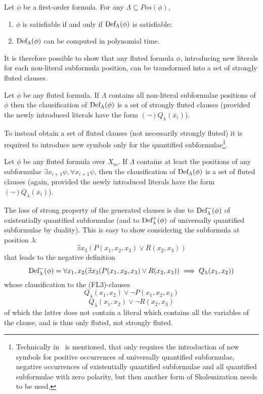 \begin{theorem}\label{thm:definitional-sat-preservation}
  Let \(\phi\) be a first-order formula. For any \(\Lambda \subseteq Pos(\phi)\),
  \begin{enumerate}
    \item \(\phi\) is satisfiable if and only if \(\fldef{\Lambda}{\phi}\) is satisfiable;
    \item \(\fldef{\Lambda}{\phi}\) can be computed in polynomial time.
  \end{enumerate}
\end{theorem} 

It is therefore possible to show that any fluted formula \(\phi\), introducing new literals for each non-literal subformula position, can be transformed into a set of strongly fluted clauses.

\begin{lemma}
  Let \(\phi\) be any fluted formula. If \(\Lambda\) contains all non-literal subformulae positions of \(\phi\) then the clausification of \(\fldef{\Lambda}{\phi}\) is a set of strongly fluted clauses (provided the newly introduced literals have the form \((\neg)Q_\lambda(\overline{x}_i)\)).
\end{lemma}

To instead obtain a set of fluted clauses (not necessarily strongly fluted) it is required to introduce new symbols only for the quantified subformulae\footnote{Technically in~\cite{hustadt2000resolution} is mentioned, that only requires the introduction of new symbols for positive occurrences of universally quantified subformulae, negative occurrences of existentially quantified subformulae and all quantified subformulae with zero polarity, but then another form of Skolemization needs to be used. }.

\begin{lemma}\label{lem:fluted-def-constraints}
  Let \(\phi\) be any fluted formula over \(X_m\). If \(\Lambda\) contains at least the positions of any subformulae \(\exists x_{i+1}\psi, \forall x_{i+1}\psi\), then the clausification of \(\fldef{\Lambda}{\phi}\) is a set of fluted clauses (again, provided the newly introduced literals have the form \((\neg)Q_\lambda(\overline{x}_i)\)).
\end{lemma}

The loss of strong property of the generated clauses is due to \(\fldef{\lambda}[-]{\phi}\) of existentially quantified subformulae (and to \(\fldef{\lambda}[+]{\phi}\) of universally quantified subformulae by duality).
This is easy to show considering the subformula at position \(\lambda\):
  \[
    \exists x_3 (P(x_1,x_2,x_3) \lor R(x_2,x_3))
  \]
that leads to the negative definition
  \[
    \fldef{\lambda}[-]{\phi} = \forall x_1,x_2(\exists x_3 (P(x_1,x_2,x_3) \lor R(x_2,x_3)) \implies Q_\lambda(x_1,x_2))
  \]
whose clausification to the (FL3)-clauses
  \[
    Q_\lambda(x_1,x_2) \lor \neg P(x_1,x_2,x_3)
  \]
  \[
    Q_\lambda(x_1,x_2) \lor \neg R(x_2,x_3)
  \]
of which the latter does not contain a literal which contains all the variables of the clause, and is thus only fluted, not strongly fluted.

